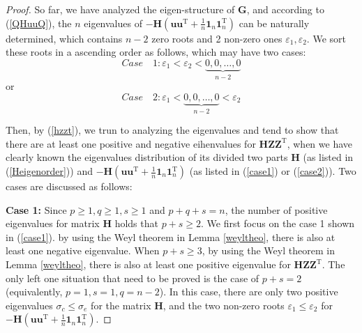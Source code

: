 \begin{proof}
So  far,  we  have  
analyzed the  eigen-structure
of  $\mathbf G$,  and 
according to 
(\ref{QHuuQ}),
the  $n$  eigenvalues  of 
$
-
\mathbf H
(\mathbf u\mathbf u^{\mathrm T}  
+\frac  1n \mathbf 1_{n}\mathbf 1_{n}^{\mathrm T} )  
$
can be  naturally  determined,  which  contains 
$n-2$ zero  roots  and 
2  non-zero  ones  
$ \varepsilon_{1}, 
\varepsilon_{2} $.
We  sort    these   roots  in  a  ascending  order   as       follows,  
which may  have  two  cases:
\begin{equation}\label{case1} 
Case \quad  1:  \varepsilon_{1}
<
\varepsilon_{2}
<
\underbrace{
	0, 0, \dots, 0}_{n-2}
\end{equation}
or 
\begin{equation}\label{case2} 
Case \quad  2:  \varepsilon_{1}
<
\underbrace{
	0, 0, \dots, 0}_{n-2}
<
\varepsilon_{2}
\end{equation}







Then, by  (\ref{hzzt}),  we
trun  to  analyzing 
the  eigenvalues  
and 
tend to 
show that 
there are at least one positive  and negative  eihenvalues for 
$
\mathbf H
\mathbf Z
\mathbf Z^{\mathrm T} 
$, 
when  we  have  clearly known  the 
eigenvalues  distribution of
its  divided two parts
$
\mathbf H
$ (as listed in (\ref{Heigenorder}))
and
$
-
\mathbf H
(\mathbf u\mathbf u^{\mathrm T}  
+\frac  1n \mathbf 1_{n}\mathbf 1_{n}^{\mathrm T} )  
$ (as listed in (\ref{case1})  or (\ref{case2})).
Two cases are discussed as follows:


\textbf{Case 1:}
Since $p \ge 1,q \ge 1,s \ge 1$ 
and $p +q +s =n$,  
the  number  of    positive  eigenvalues   for  matrix $
\mathbf H
$
holds  that 
$ p+s \ge 2$.
We  first   focus on  the case  1  shown in 
 (\ref{case1}).
  by  using the Weyl  theorem  in  Lemma  \ref{weyltheo},  
  there is also  at  least  one  negative  eigenvalue.
 When 
 $ p+s \ge 3$, 
 by  using the Weyl  theorem  in  Lemma  \ref{weyltheo},  
 there is also  at  least  one  positive  eigenvalue
 for 
 $
 \mathbf H
 \mathbf Z
 \mathbf Z^{\mathrm T} 
 $.
 The  only  left   one  situation  that  need to be  proved  is  
 the  case  of 
  $ p+s =2$ (equivalently, $ p=1,s=1, q=n-2$). 
 In this case, there are only  two positive  eigenvalues
  $  \sigma_{c}  \le  \sigma_{e} $ for 
 the matrix $\mathbf H$, and the two non-zero  roots 
 $\varepsilon_{1} \le  \varepsilon_{2}$ for 
 $
 -
 \mathbf H
 (\mathbf u\mathbf u^{\mathrm T}  
 +\frac  1n \mathbf 1_{n}\mathbf 1_{n}^{\mathrm T} )  
 $.


\end{proof}
